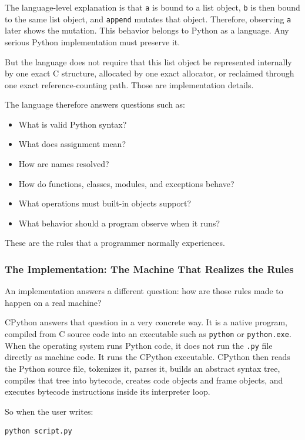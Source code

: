 The language-level explanation is that \texttt{a} is bound to a list object, \texttt{b} is then bound to the same list object, and \texttt{append} mutates that object. Therefore, observing \texttt{a} later shows the mutation. This behavior belongs to Python as a language. Any serious Python implementation must preserve it.

But the language does not require that this list object be represented internally by one exact C structure, allocated by one exact allocator, or reclaimed through one exact reference-counting path. Those are implementation details.

The language therefore answers questions such as:

\begin{itemize}
    \item What is valid Python syntax?
    \item What does assignment mean?
    \item How are names resolved?
    \item How do functions, classes, modules, and exceptions behave?
    \item What operations must built-in objects support?
    \item What behavior should a program observe when it runs?
\end{itemize}

These are the rules that a programmer normally experiences.

\subsubsection{The Implementation: The Machine That Realizes the Rules}

An implementation answers a different question: how are those rules made to happen on a real machine?

CPython answers that question in a very concrete way. It is a native program, compiled from C source code into an executable such as \texttt{python} or \texttt{python.exe}. When the operating system runs Python code, it does not run the \texttt{.py} file directly as machine code. It runs the CPython executable. CPython then reads the Python source file, tokenizes it, parses it, builds an abstract syntax tree, compiles that tree into bytecode, creates code objects and frame objects, and executes bytecode instructions inside its interpreter loop.

So when the user writes:

\begin{verbatim}
python script.py
\end{verbatim}

